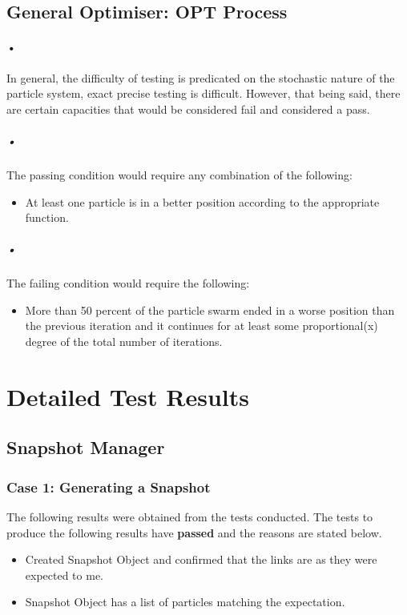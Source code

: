 \documentclass[11pt]{article}
\begin{document}
\subsection{General Optimiser: OPT Process}
\paragraph{•}
In general, the difficulty of testing is predicated on the stochastic nature of the particle system, exact precise testing is difficult. However, that being said, there are certain capacities that would be considered fail and considered a pass. 

\subparagraph{•}
The passing condition would require any combination of the following:
\begin{itemize}
\item At least one particle is in a better position according to the appropriate function.
\end{itemize}

\subparagraph{•}
The failing condition would require the following: 
\begin{itemize}
\item More than 50 percent of the particle swarm ended in a worse position than the previous iteration and it continues for at least some proportional(x) degree of the total number of iterations.
\end{itemize}


\section{Detailed Test Results}
\subsection{Snapshot Manager}
\subsubsection{Case 1: Generating a Snapshot}
The following results were obtained from the tests conducted. The tests to produce the
following results have \textbf{passed} and the reasons are stated below.

\begin{itemize}
	\item Created Snapshot Object and confirmed that the links are as they were expected to me.
	\item Snapshot Object has a list of particles matching the expectation.
\end{itemize}
\end{document}
